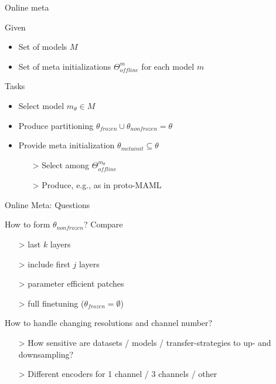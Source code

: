 \documentclass[aspectratio=169,12pt,handout]{beamer}
\begin{document}
\begin{frame}{Online meta}

\begin{block}{Given}
    \begin{itemize}
        \item Set of models $M$
        \item Set of meta initializations $\Theta_{offline}^m$ for each model $m$
    \end{itemize}
\end{block}

\begin{block}{Tasks}
    \begin{itemize}
        \item Select model $m_\theta \in M$
        \item Produce partitioning $\theta_{frozen} \cup \theta_{nonfrozen} = \theta$
        \item Provide meta initialization $\theta_{metainit} \subseteq  \theta$
        \begin{itemize}
            \item[>] Select among $\Theta_{offline}^{m_\theta}$
            \item[>] Produce, e.g., as in proto-MAML
        \end{itemize}
    \end{itemize}
\end{block}

\end{frame}


\begin{frame}{Online Meta: Questions}


\begin{itemizebig}
    \item How to form $\theta_{nonfrozen}$? Compare
    \begin{itemize}
        \item[>] last $k$ layers
        \item[>] include first $j$ layers
        \item[>] parameter efficient patches
        \item[>] full finetuning ($\theta_{frozen} = \emptyset$)
    \end{itemize}

    \item How to handle changing resolutions and channel number?
    \begin{itemize}
        \item[>] How sensitive are datasets / models / transfer-strategies to up- and downsampling?
        \item[>] Different encoders for 1 channel / 3 channels / other
    \end{itemize}
\end{itemizebig}

\end{frame}
\end{document}
